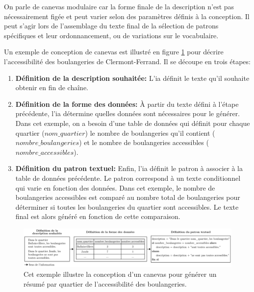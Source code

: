 \newpar{}

On parle de canevas modulaire car la forme finale de la description n’est pas nécessairement figée et peut varier selon des paramètres définis à la conception. Il peut s’agir lors de l’assemblage du texte final de la sélection de patrons spécifiques et leur ordonnancement, ou de variations sur le vocabulaire.

\newpar{}

Un exemple de conception de canevas est illustré en figure \ref{fig:desc_canevas_modulaire} pour décrire l'accessibilité des boulangeries de Clermont-Ferrand. Il se découpe en trois étapes:

\begin{enumerate}
    \item \textbf{Définition de la description souhaitée:} L'\gls{ia} définit le texte qu'il souhaite obtenir en fin de chaîne.
    \item \textbf{Définition de la forme des données:} À partir du texte défini à l'étape précédente, l'\gls{ia} détermine quelles données sont nécessaires pour le générer. Dans cet exemple, on a besoin d'une table de données qui définit pour chaque quartier ($nom\_quartier$) le nombre de boulangeries qu'il contient ($nombre\_boulangeries$) et le nombre de boulangeries accessibles ($nombre\_accessibles$). 
    \item \textbf{Définition du patron textuel:} Enfin, l'\gls{ia} définit le patron à associer à la table de données précédente. Le patron correspond à un texte conditionnel qui varie en fonction des données. Dans cet exemple, le nombre de boulangeries accessibles est comparé au nombre total de boulangeries pour déterminer si toutes les boulangeries du quartier sont accessibles. Le texte final est alors généré en fonction de cette comparaison. 
\end{enumerate}

\begin{figure}[ht]
    \centering
    \includegraphics[width=\textwidth]{images/description/exemple_canevas.pdf}
    \caption[Exemple de canevas de description]{Cet exemple illustre la conception d'un canevas pour générer un résumé par quartier de l'accessibilité des boulangeries.}
    \label{fig:desc_canevas_modulaire}
\end{figure}

